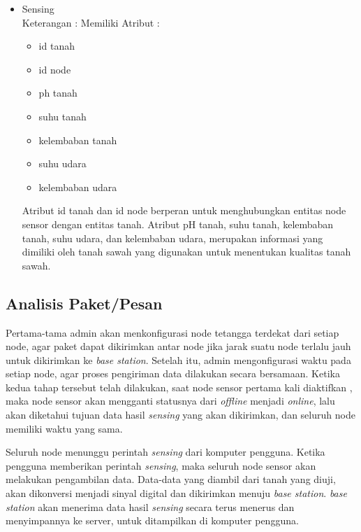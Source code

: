 \begin{itemize}
\begin{itemize}
\begin{itemize}
                 \item Sensing\\
                 Keterangan :
                  Memiliki Atribut :
                 \begin{itemize}
                     \item id tanah
                     \item id node
                     \item ph tanah
                     \item suhu tanah
                     \item kelembaban tanah
                     \item suhu udara
                     \item kelembaban udara
                 \end{itemize}
                 
                 
                 \quad  Atribut id tanah dan id node berperan untuk menghubungkan entitas node sensor dengan entitas tanah. Atribut pH tanah, suhu tanah, kelembaban tanah, suhu udara, dan kelembaban udara, merupakan informasi yang dimiliki oleh tanah sawah yang digunakan untuk menentukan kualitas tanah sawah. \\
                 
            \end{itemize}
        \end{itemize}
\end{itemize}

\subsection{Analisis Paket/Pesan}
 Pertama-tama admin akan menkonfigurasi node tetangga terdekat dari setiap node, agar paket dapat dikirimkan antar node jika jarak suatu node terlalu jauh untuk dikirimkan ke \textit{base station}. Setelah itu, admin mengonfigurasi waktu pada setiap node, agar proses pengiriman data dilakukan secara bersamaan. Ketika kedua tahap tersebut telah dilakukan, saat node sensor pertama kali diaktifkan , maka node sensor akan mengganti statusnya dari \textit{offline} menjadi \textit{online}, lalu akan diketahui tujuan data hasil \textit{sensing} yang akan dikirimkan, dan seluruh node memiliki waktu yang sama.
 
 Seluruh node menunggu perintah \textit{sensing} dari komputer pengguna. Ketika pengguna memberikan perintah \textit{sensing}, maka seluruh node sensor akan melakukan pengambilan data. Data-data yang diambil dari tanah yang diuji, akan dikonversi menjadi sinyal digital dan dikirimkan menuju \textit{base station}. \textit{base station} akan menerima data hasil \textit{sensing} secara terus menerus dan menyimpannya ke server, untuk ditampilkan di komputer pengguna.
